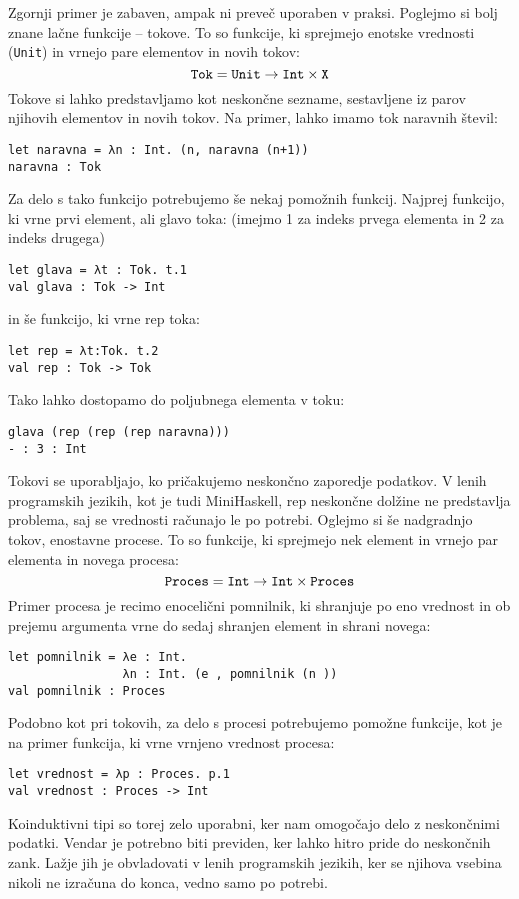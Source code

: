 \documentclass[12pt,a4paper,openany]{book}
\begin{document}
Zgornji primer je zabaven, ampak ni preveč uporaben v praksi. Poglejmo si bolj znane lačne funkcije -- tokove. To so funkcije, ki sprejmejo enotske vrednosti (\lstinline{Unit}) in vrnejo pare elementov in novih tokov:
\begin{equation}
    \mathtt{Tok} = \mathtt{Unit} \rightarrow \mathtt{Int} \times \mathtt{X} \notag
\end{equation}
Tokove si lahko predstavljamo kot neskončne sezname, sestavljene iz parov njihovih elementov in novih tokov. Na primer, lahko imamo tok naravnih števil:
\begin{lstlisting}
let naravna = λn : Int. (n, naravna (n+1))
naravna : Tok
\end{lstlisting}
Za delo s tako funkcijo potrebujemo še nekaj pomožnih funkcij. Najprej funkcijo, ki vrne prvi element, ali glavo toka: (imejmo 1 za indeks prvega elementa in 2 za indeks drugega)
\begin{lstlisting}
let glava = λt : Tok. t.1
val glava : Tok -> Int
\end{lstlisting}
in še funkcijo, ki vrne rep toka:
\begin{lstlisting}
let rep = λt:Tok. t.2
val rep : Tok -> Tok
\end{lstlisting}
Tako lahko dostopamo do poljubnega elementa v toku:
\begin{lstlisting}
glava (rep (rep (rep naravna)))
- : 3 : Int
\end{lstlisting}
Tokovi se uporabljajo, ko pričakujemo neskončno zaporedje podatkov. V lenih programskih jezikih, kot je tudi MiniHaskell, rep neskončne dolžine
ne predstavlja problema, saj se vrednosti računajo le po potrebi.
Oglejmo si še nadgradnjo tokov, enostavne procese. To so funkcije, ki sprejmejo nek element in vrnejo par elementa in novega procesa:
\begin{equation}
    \mathtt{Proces} = \mathtt{Int} \rightarrow \mathtt{Int} \times \mathtt{Proces} \notag
\end{equation}
Primer procesa je recimo enocelični pomnilnik, ki shranjuje po eno vrednost in ob prejemu argumenta vrne do sedaj shranjen element in shrani novega:
\begin{lstlisting}
let pomnilnik = λe : Int. 
                λn : Int. (e , pomnilnik (n ))
val pomnilnik : Proces  
\end{lstlisting}
Podobno kot pri tokovih, za delo s procesi potrebujemo pomožne funkcije, kot je na primer funkcija, ki vrne vrnjeno vrednost procesa:
\begin{lstlisting}
let vrednost = λp : Proces. p.1
val vrednost : Proces -> Int  
\end{lstlisting}
Koinduktivni tipi so torej zelo uporabni, ker nam omogočajo delo z neskončnimi podatki. Vendar je potrebno biti previden, ker lahko hitro pride do neskončnih zank. 
Lažje jih je obvladovati v lenih programskih jezikih, ker se njihova vsebina nikoli ne izračuna do konca, vedno samo po potrebi.
\end{document}
